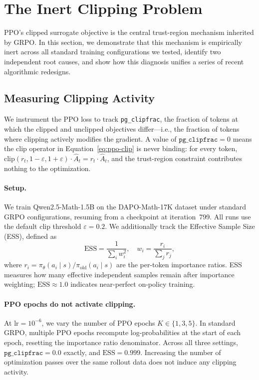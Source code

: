 
\section{The Inert Clipping Problem}
\label{sec:inert-clipping}

PPO's clipped surrogate objective is the central trust-region mechanism inherited by GRPO.
In this section, we demonstrate that this mechanism is empirically inert across all standard training configurations we tested, identify two independent root causes, and show how this diagnosis unifies a series of recent algorithmic redesigns.

\subsection{Measuring Clipping Activity}
\label{sec:measuring-clipping}

We instrument the PPO loss to track \texttt{pg\_clipfrac}, the fraction of tokens at which the clipped and unclipped objectives differ---i.e., the fraction of tokens where clipping actively modifies the gradient.
A value of $\texttt{pg\_clipfrac} = 0$ means the clip operator in Equation~\ref{eq:ppo-clip} is never binding: for every token, $\text{clip}(r_t, 1-\varepsilon, 1+\varepsilon) \cdot \hat{A}_t = r_t \cdot \hat{A}_t$, and the trust-region constraint contributes nothing to the optimization.

\paragraph{Setup.}
We train Qwen2.5-Math-1.5B on the DAPO-Math-17K dataset under standard GRPO configurations, resuming from a checkpoint at iteration~799.
All runs use the default clip threshold $\varepsilon = 0.2$.
We additionally track the Effective Sample Size (ESS), defined as
\begin{equation}
\label{eq:ess}
\text{ESS} = \frac{1}{\sum_{i} w_i^2}, \quad w_i = \frac{r_i}{\sum_j r_j},
\end{equation}
where $r_i = \pi_\theta(a_i \mid s) / \pi_{\text{old}}(a_i \mid s)$ are the per-token importance ratios.
ESS measures how many effective independent samples remain after importance weighting; $\text{ESS} \approx 1.0$ indicates near-perfect on-policy training.

\paragraph{PPO epochs do not activate clipping.}
At $\text{lr} = 10^{-6}$, we vary the number of PPO epochs $K \in \{1, 3, 5\}$.
In standard GRPO, multiple PPO epochs recompute log-probabilities at the start of each epoch, resetting the importance ratio denominator.
Across all three settings, $\texttt{pg\_clipfrac} = 0.0$ exactly, and $\text{ESS} = 0.999$.
Increasing the number of optimization passes over the same rollout data does not induce any clipping activity.

